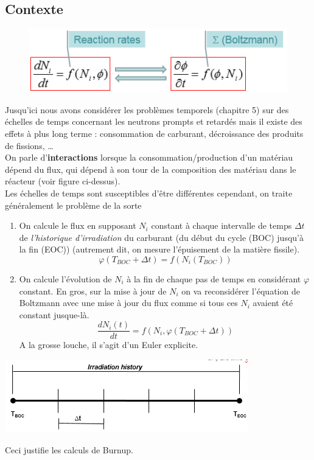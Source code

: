 	\subsection{Contexte}
	\begin{figure}
	\vspace{-5mm}
	\includegraphics[scale=0.54]{ch6/image3.png}
	\end{figure}	
	Jusqu'ici nous avons considérer les problèmes temporels (chapitre 5) sur des échelles de temps
	concernant les neutrons prompts et retardés mais il existe des effets à plus long terme : 
	consommation de carburant, décroissance des produits de fissions, \dots \\
	
	On parle d'\textbf{interactions} lorsque la consommation/production d'un matériau dépend du flux,
	qui dépend à son tour de la composition des matériau dans le réacteur (voir figure ci-dessus).\\
	
	Les échelles de temps sont susceptibles d'être différentes cependant, on traite généralement le 
	problème de la sorte
	\begin{enumerate}
	\item On calcule le flux en supposant $N_i$ constant à chaque intervalle de temps $\Delta t$ de 
	\textit{l'historique d'irradiation} du carburant (du début du cycle (BOC) jusqu'à la fin (EOC))
	(autrement dit, on mesure l'épuisement de la matière fissile).
	\begin{equation}
	\varphi ({T_{BOC}} + \Delta t) = f({N_i}({T_{BOC}}))
	\end{equation}
	\item On calcule l'évolution de $N_i$ à la fin de chaque pas de temps en considérant $\varphi$ 
	constant. En gros, sur la mise à jour de $N_i$ on va reconsidérer l'équation de Boltzmann avec
	une mise à jour du flux comme si tous ces $N_i$ avaient été constant jusque-là.
	\begin{equation}
	\frac{{d{N_i}(t)}}{{dt}} = f({N_i},\varphi ({T_{BOC}} + \Delta t))
	\end{equation}
	A la grosse louche, il s'agit d'un Euler explicite.
	\end{enumerate}
	\begin{center}
	\includegraphics[scale=0.85]{ch6/image4.png}
	\end{center}
	Ceci justifie les calculs de Burnup.

